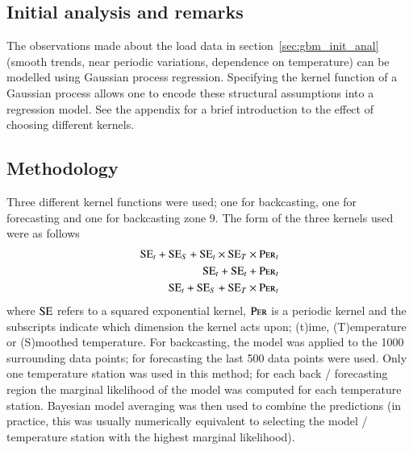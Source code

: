 \documentclass[preprint,authoryear,12pt]{elsarticle}
\newcommand{\acro}[1]{\textsc{#1}}
\def\SE{\acro{SE}}
\def\Per{\acro{Per}}
\begin{document}
\label{sec:gp}

\subsection{Initial analysis and remarks}

The observations made about the load data in section~\ref{sec:gbm_init_anal} (\ie smooth trends, near periodic variations, dependence on temperature) can be modelled using Gaussian process regression.
Specifying the kernel function of a Gaussian process allows one to encode these structural assumptions into a regression model.
See the appendix for a brief introduction to the effect of choosing different kernels.

\subsection{Methodology}

Three different kernel functions were used; one for backcasting, one for forecasting and one for backcasting zone 9.
The form of the three kernels used were as follows\footnotemark
{}
\begin{eqnarray}
\SE_t + \SE_S + \SE_t \times \SE_T \times \Per_t \label{eqn:kernel1}\\
\SE_t + \SE_t + \Per_t \label{eqn:kernel2}\\
\SE_t + \SE_S + \SE_T \times \Per_t\label{eqn:kernel3}
\end{eqnarray}
where $\SE$ refers to a squared exponential kernel, $\Per$ is a periodic kernel and the subscripts indicate which dimension the kernel acts upon; (t)ime, (T)emperature or (S)moothed temperature.
For backcasting, the model was applied to the 1000 surrounding data points; for forecasting the last 500 data points were used.
Only one temperature station was used in this method; for each back / forecasting region the marginal likelihood of the model was computed for each temperature station.
Bayesian model averaging \citep[e.g.][]{Hoeting1999} was then used to combine the predictions (in practice, this was usually numerically equivalent to selecting the model / temperature station with the highest marginal likelihood).
\end{document}
